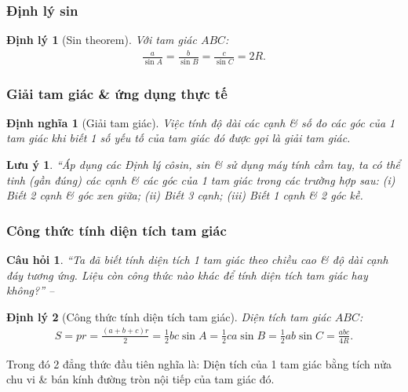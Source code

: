 \documentclass{article}
\numberwithin{equation}{section}
\newtheorem{definition}{Định nghĩa}[section]
\newtheorem{theorem}{Định lý}[section]
\newtheorem{remark}{Lưu ý}[section]
\newtheorem{question}{Câu hỏi}[section]
\begin{document}
\subsubsection{Định lý sin}

\begin{theorem}[Sin theorem]
	Với tam giác $ABC$:
	\begin{align*}
		\frac{a}{\sin A} = \frac{b}{\sin B} = \frac{c}{\sin C} = 2R. 
	\end{align*}
\end{theorem}

\subsubsection{Giải tam giác \& ứng dụng thực tế}

\begin{definition}[Giải tam giác]
	Việc tính độ dài các cạnh \& số đo các góc của 1 tam giác khi biết 1 số yếu tố của tam giác đó được gọi là \emph{giải tam giác}.
\end{definition}

\begin{remark}
	``Áp dụng các Định lý côsin, sin \& sử dụng máy tính cầm tay, ta có thể tinh (gần đúng) các cạnh \& các góc của 1 tam giác trong các trường hợp sau: (i) Biết 2 cạnh \& góc xen giữa; (ii) Biết 3 cạnh; (iii) Biết 1 cạnh \& 2 góc kề.
\end{remark}

\subsubsection{Công thức tính diện tích tam giác}

\begin{question}
	``Ta đã biết tính diện tích 1 tam giác theo chiều cao \& độ dài cạnh đáy tương ứng. Liệu còn công thức nào khác để tính diện tích tam giác hay không?'' -- \cite[p. 41]{Khoai_Anh_Tan_Thang_Anh_Cuong_Duong_Dang_Ha_Hanh_Hong_Son_Tuan_Vuong_Toan_10_tap_1}
\end{question}

\begin{theorem}[Công thức tính diện tích tam giác]
	 Diện tích tam giác $ABC$:
	 \begin{align*}
	 	S = pr = \frac{(a + b + c)r}{2} = \frac{1}{2}bc\sin A = \frac{1}{2}ca\sin B = \frac{1}{2}ab\sin C = \frac{abc}{4R}.
	 \end{align*}
\end{theorem}
Trong đó 2 đẳng thức đầu tiên nghĩa là: Diện tích của 1 tam giác bằng tích nửa chu vi \& bán kính đường tròn nội tiếp của tam giác đó.
\end{document}
